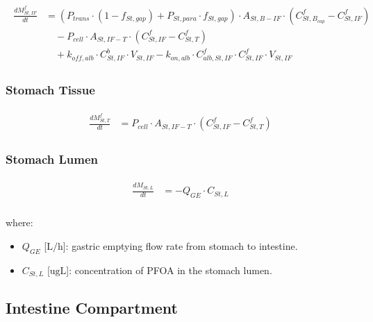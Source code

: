 \documentclass[preprint,12pt,authoryear]{elsarticle}
\begin{document}
\begin{align}
\begin{aligned}
\frac{dM_{St,IF}^f}{dt} &= (P_{trans}\cdot  (1-f_{St,gap}) + P_{St,para} \cdot f_{St,gap})  \cdot A_{St,B-IF} \cdot (C_{St,B_{cap}}^f - C_{St,IF}^f) \\
& \quad -  P_{cell} \cdot A_{St,IF-T} \cdot (C_{St,IF}^f - C_{St,T}^f) \\
& \quad + k_{off,alb} \cdot C_{St,IF}^b \cdot V_{St,IF}
- k_{on,alb} \cdot C_{alb,St,IF}^f \cdot C_{St,IF}^f \cdot V_{St,IF}
\end{aligned}
\label{eq:PFOA_stomach_interstitial}
\end{align}

\subsubsection{Stomach Tissue}

\begin{align}
\begin{aligned}
\frac{dM_{St,T}^f}{dt} &=  P_{cell} \cdot A_{St,IF-T} \cdot (C_{St,IF}^f - C_{St,T}^f)
\end{aligned}
\label{eq:PFOA_stomach_tissue}
\end{align}

\subsubsection{Stomach Lumen}

\begin{align}
\begin{aligned}
\frac{dM_{St,L}}{dt} &= - Q_{GE} \cdot C_{St,L}\\
\end{aligned}
\label{eq:PFOA_stomach_lumen}
\end{align}

\noindent 
where:
\begin{itemize}
    \item $Q_{GE}$ [$\text{L}/\text{h}$]: gastric emptying flow rate from stomach to intestine.
     \item $C_{St,L}$ [$\text{ug}\text{L}$]: concentration of PFOA in the stomach lumen.
\end{itemize}

\subsection{Intestine Compartment}
\end{document}
